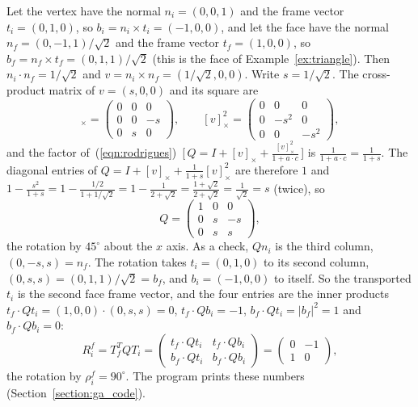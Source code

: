 \begin{example}
\label{ex:transport}
Let the vertex have the normal $n_i = (0, 0, 1)$ and the frame vector $t_i = (0, 1, 0)$, so $b_i = n_i \times t_i = (-1, 0, 0)$, and let the face have the normal $n_f = (0, -1, 1)/\sqrt 2$ and the frame vector $t_f = (1, 0, 0)$, so $b_f = n_f \times t_f = (0, 1, 1)/\sqrt 2$ (this is the face of Example~\ref{ex:triangle}). Then $n_i \cdot n_f = 1/\sqrt 2$ and $v = n_i \times n_f = (1/\sqrt 2, 0, 0)$. Write $s = 1/\sqrt2$. The cross-product matrix of $v = (s, 0, 0)$ and its square are
\begin{equation*}
[v]_\times = \begin{pmatrix} 0 & 0 & 0 \\ 0 & 0 & -s \\ 0 & s & 0 \end{pmatrix}, \qquad [v]_\times^2 = \begin{pmatrix} 0 & 0 & 0 \\ 0 & -s^2 & 0 \\ 0 & 0 & -s^2 \end{pmatrix},
\end{equation*}
and the factor of~(\ref{eqn:rodrigues})~[\,$Q = I + [v]_\times + \frac{[v]_\times^2}{1 + a\cdot c}$\,] is $\frac{1}{1 + a\cdot c} = \frac{1}{1 + s}$. The diagonal entries of $Q = I + [v]_\times + \frac{1}{1+s}[v]_\times^2$ are therefore $1$ and $1 - \frac{s^2}{1+s} = 1 - \frac{1/2}{1 + 1/\sqrt2} = 1 - \frac{1}{2 + \sqrt 2} = \frac{1 + \sqrt 2}{2 + \sqrt 2} = \frac{1}{\sqrt 2} = s$ (twice), so
\begin{equation*}
Q = \begin{pmatrix} 1 & 0 & 0 \\ 0 & s & -s \\ 0 & s & s \end{pmatrix},
\end{equation*}
the rotation by $45^\circ$ about the $x$ axis. As a check, $Q n_i$ is the third column, $(0, -s, s) = n_f$. The rotation takes $t_i = (0, 1, 0)$ to its second column, $(0, s, s) = (0, 1, 1)/\sqrt 2 = b_f$, and $b_i = (-1, 0, 0)$ to itself. So the transported $t_i$ is the second face frame vector, and the four entries are the inner products $t_f\cdot Q t_i = (1,0,0)\cdot(0,s,s) = 0$, $t_f\cdot Q b_i = -1$, $b_f \cdot Q t_i = |b_f|^2 = 1$ and $b_f\cdot Q b_i = 0$:
\begin{equation*}
R_i^f = T_f^T Q T_i = \begin{pmatrix} t_f \cdot Q t_i & t_f \cdot Q b_i \\ b_f \cdot Q t_i & b_f \cdot Q b_i \end{pmatrix} = \begin{pmatrix} 0 & -1 \\ 1 & 0 \end{pmatrix},
\end{equation*}
the rotation by $\rho_i^f = 90^\circ$. The program  prints these numbers (Section~\ref{section:ga_code}).
\end{example}

